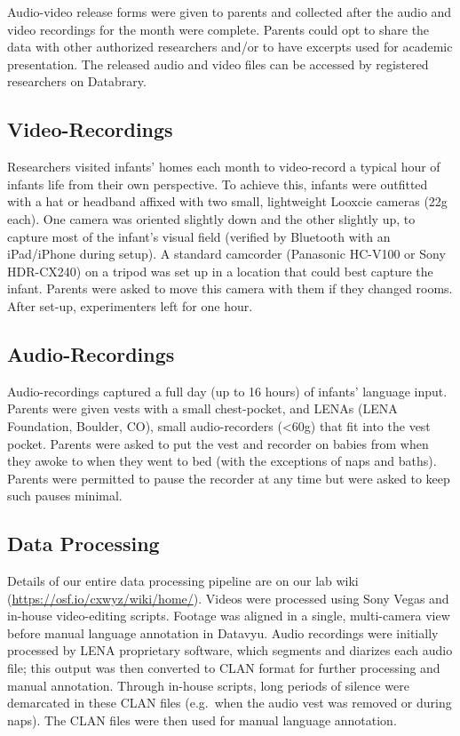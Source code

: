 \documentclass[floatsintext,man]{apa6}
\theoremstyle{definition}
\theoremstyle{definition}
\theoremstyle{definition}
\theoremstyle{remark}
\begin{document}
Audio-video release forms were given to parents and collected after the
audio and video recordings for the month were complete. Parents could
opt to share the data with other authorized researchers and/or to have
excerpts used for academic presentation. The released audio and video
files can be accessed by registered researchers on Databrary.

\subsection{Video-Recordings}\label{video-recordings}

Researchers visited infants' homes each month to video-record a typical
hour of infants life from their own perspective. To achieve this,
infants were outfitted with a hat or headband affixed with two small,
lightweight Looxcie cameras (22g each). One camera was oriented slightly
down and the other slightly up, to capture most of the infant's visual
field (verified by Bluetooth with an iPad/iPhone during setup). A
standard camcorder (Panasonic HC-V100 or Sony HDR-CX240) on a tripod was
set up in a location that could best capture the infant. Parents were
asked to move this camera with them if they changed rooms. After set-up,
experimenters left for one hour.

\subsection{Audio-Recordings}\label{audio-recordings}

Audio-recordings captured a full day (up to 16 hours) of infants'
language input. Parents were given vests with a small chest-pocket, and
LENAs (LENA Foundation, Boulder, CO), small audio-recorders
(\textless{}60g) that fit into the vest pocket. Parents were asked to
put the vest and recorder on babies from when they awoke to when they
went to bed (with the exceptions of naps and baths). Parents were
permitted to pause the recorder at any time but were asked to keep such
pauses minimal.

\subsection{Data Processing}\label{data-processing}

Details of our entire data processing pipeline are on our lab wiki
(\url{https://osf.io/cxwyz/wiki/home/}). Videos were processed using
Sony Vegas and in-house video-editing scripts. Footage was aligned in a
single, multi-camera view before manual language annotation in Datavyu.
Audio recordings were initially processed by LENA proprietary software,
which segments and diarizes each audio file; this output was then
converted to CLAN format for further processing and manual annotation.
Through in-house scripts, long periods of silence were demarcated in
these CLAN files (e.g.~when the audio vest was removed or during naps).
The CLAN files were then used for manual language annotation.
\end{document}

